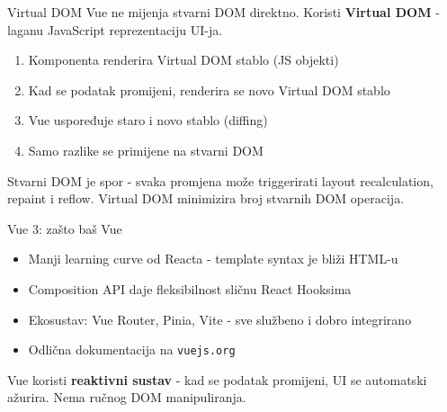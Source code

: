 \begin{frame}{Virtual DOM}
Vue ne mijenja stvarni DOM direktno. Koristi \textbf{Virtual DOM} - laganu JavaScript reprezentaciju UI-ja.

\vspace{0.6em}
\begin{enumerate}
  \item Komponenta renderira Virtual DOM stablo (JS objekti)
  \item Kad se podatak promijeni, renderira se novo Virtual DOM stablo
  \item Vue uspoređuje staro i novo stablo (diffing)
  \item Samo razlike se primijene na stvarni DOM
\end{enumerate}

\vspace{0.6em}
Stvarni DOM je spor - svaka promjena može triggerirati layout recalculation, repaint i reflow. Virtual DOM minimizira broj stvarnih DOM operacija.
\end{frame}

\begin{frame}{Vue 3: zašto baš Vue}
\begin{itemize}
  \item Manji learning curve od Reacta - template syntax je bliži HTML-u
  \item Composition API daje fleksibilnost sličnu React Hooksima
  \item Ekosustav: Vue Router, Pinia, Vite - sve službeno i dobro integrirano
  \item Odlična dokumentacija na \texttt{vuejs.org}
\end{itemize}

\vspace{0.6em}
Vue koristi \textbf{reaktivni sustav} - kad se podatak promijeni, UI se automatski ažurira. Nema ručnog DOM manipuliranja.
\end{frame}

